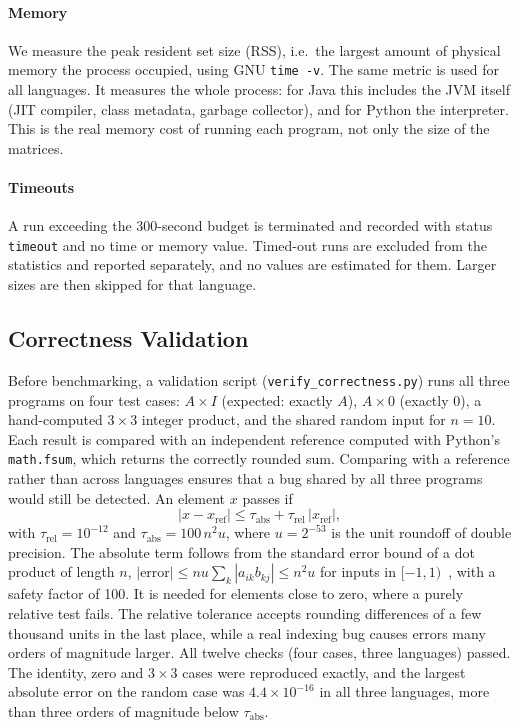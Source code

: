 \documentclass[conference,a4paper]{IEEEtran}
\newcommand{\code}[1]{\texttt{#1}}
\begin{document}
\paragraph{Memory} We measure the peak resident set size (RSS), i.e.\ the
largest amount of physical memory the process occupied, using GNU
\code{time -v}. The same metric is used for all languages. It measures the
whole process: for Java this includes the JVM itself (JIT compiler, class
metadata, garbage collector), and for Python the interpreter. This is the real
memory cost of running each program, not only the size of the matrices.

\paragraph{Timeouts} A run exceeding the 300-second budget is terminated and
recorded with status \code{timeout} and no time or memory value. Timed-out runs
are excluded from the statistics and reported separately, and no values are
estimated for them. Larger sizes are then skipped for that language.

\subsection{Correctness Validation}
Before benchmarking, a validation script (\code{verify\_correctness.py}) runs
all three programs on four test cases: $A \times I$ (expected: exactly $A$),
$A \times 0$ (exactly $0$), a hand-computed $3 \times 3$ integer product, and the
shared random input for $n = 10$. Each result is compared with an independent
reference computed with Python's \code{math.fsum}, which returns the correctly
rounded sum. Comparing with a reference rather than across languages ensures
that a bug shared by all three programs would still be detected. An element
$x$ passes if
\begin{equation}
  |x - x_{\text{ref}}| \le \tau_{\text{abs}} + \tau_{\text{rel}}\, |x_{\text{ref}}|,
\end{equation}
with $\tau_{\text{rel}} = 10^{-12}$ and $\tau_{\text{abs}} = 100\, n^2 u$, where
$u = 2^{-53}$ is the unit roundoff of double precision. The absolute term
follows from the standard error bound of a dot product of length $n$,
$|\text{error}| \le n u \sum_k |a_{ik} b_{kj}| \le n^2 u$ for inputs in
$[-1,1)$~\cite{higham2002}, with a safety factor of 100. It is needed for
elements close to zero, where a purely relative test fails. The relative
tolerance accepts rounding differences of a few thousand units in the last
place, while a real indexing bug causes errors many orders of magnitude larger.
All twelve checks (four cases, three languages) passed. The identity, zero and
$3 \times 3$ cases were reproduced exactly, and the largest absolute error on
the random case was $4.4 \times 10^{-16}$ in all three languages, more than
three orders of magnitude below $\tau_{\text{abs}}$.
\end{document}
